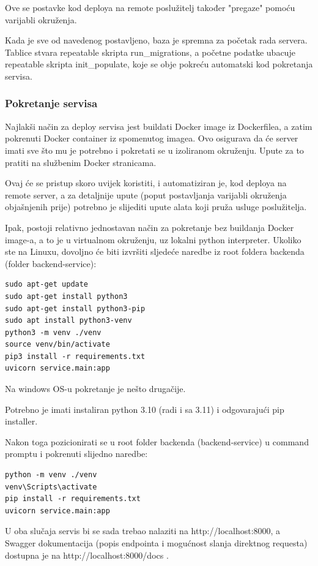 		Ove se postavke kod deploya na remote poslužitelj također "pregaze" pomoću varijabli okruženja.
		
		Kada je sve od navedenog postavljeno, baza je spremna za početak rada servera. Tablice stvara repeatable skripta run\_migrations, a početne podatke ubacuje repeatable skripta init\_populate, koje se obje pokreću automatski kod pokretanja servisa.
		
		\subsubsection{Pokretanje servisa}
		
		Najlakši način za deploy servisa jest buildati Docker image iz Dockerfilea, a zatim pokrenuti Docker container iz spomenutog imagea. Ovo osigurava da će server imati sve što mu je potrebno i pokretati se u izoliranom okruženju. Upute za to pratiti na službenim Docker stranicama.
		
		Ovaj će se pristup skoro uvijek koristiti, i automatiziran je, kod deploya na remote server, a za detaljnije upute (poput postavljanja varijabli okruženja objašnjenih prije) potrebno je slijediti upute alata koji pruža usluge poslužitelja.
		
		Ipak, postoji relativno jednostavan način za pokretanje bez buildanja Docker image-a, a to je u virtualnom okruženju, uz lokalni python interpreter. Ukoliko ste na Linuxu, dovoljno će biti izvršiti sljedeće naredbe iz root foldera backenda (folder backend-service):
		
		\begin{lstlisting}
sudo apt-get update
sudo apt-get install python3
sudo apt-get install python3-pip
sudo apt install python3-venv
python3 -m venv ./venv
source venv/bin/activate
pip3 install -r requirements.txt
uvicorn service.main:app \end{lstlisting}

		Na windows OS-u pokretanje je nešto drugačije.
		
		Potrebno je imati instaliran python 3.10 (radi i sa 3.11) i odgovarajući pip installer.
		
		Nakon toga pozicionirati se u root folder backenda (backend-service) u command promptu i pokrenuti slijedno naredbe:
		
		\begin{lstlisting}
python -m venv ./venv
venv\Scripts\activate
pip install -r requirements.txt
uvicorn service.main:app \end{lstlisting}
		
		
		U oba slučaja servis bi se sada trebao nalaziti na http://localhost:8000, a Swagger dokumentacija (popis endpointa i mogućnost slanja direktnog requesta) dostupna je na http://localhost:8000/docs .
		
		\eject
		
